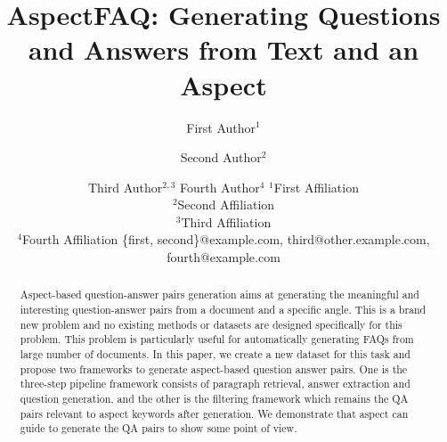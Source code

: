\documentclass{article}
\title{AspectFAQ: Generating Questions and Answers from Text and an Aspect}
\author{
First Author$^1$
\and
Second Author$^2$\and
Third Author$^{2,3}$\And
Fourth Author$^4$
\affiliations
$^1$First Affiliation\\
$^2$Second Affiliation\\
$^3$Third Affiliation\\
$^4$Fourth Affiliation
\emails
\{first, second\}@example.com,
third@other.example.com,
fourth@example.com
}
\begin{document}
\maketitle

\begin{abstract}
Aspect-based question-answer pairs generation aims at generating the 
meaningful and interesting question-answer pairs from a document and 
a specific angle. 
This is a brand new problem and no existing methods or datasets are designed specifically for this problem. 
This problem is particularly useful for automatically generating
FAQs from large number of documents. 
In this paper, we create a new dataset for this task and propose
 two frameworks to generate aspect-based question answer pairs.
One is the three-step pipeline framework consists of paragraph retrieval, answer extraction and question generation,
and the other is the filtering framework which remains the QA pairs relevant to aspect keywords after generation.
We demonstrate that aspect can guide to generate the QA pairs to show some point of view. 


\end{abstract}



% 




















\end{document}
